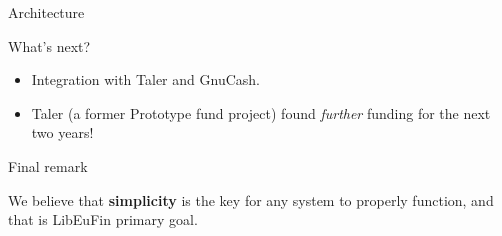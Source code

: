 \documentclass[pdf]{beamer}
\begin{document}
\begin{frame}{Architecture}
\end{frame}

\begin{frame}{What's next?}
  \begin{itemize}
    \item Integration with Taler and GnuCash.
    \item Taler (a former Prototype fund project) found {\it further} funding for the next two years!
  \end{itemize}
\end{frame}

\begin{frame}{Final remark}
  \begin{center}
  We believe that \textbf{simplicity} is the key for any system to
  properly function, and that is LibEuFin primary goal.
  \end{center}
\end{frame}
\end{document}
